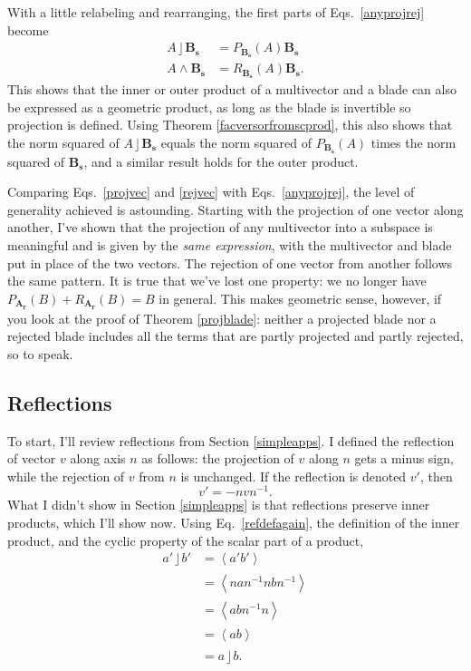 \documentclass{utarticle}
\newcommand{\bl}[1]{\ensuremath{\bm{#1}}}
\DeclareMathOperator{\lin}{\rfloor}
\DeclareMathOperator{\out}{\wedge}
\newcommand{\grade}[2][]{\ensuremath{\left\langle #2 \right\rangle_{#1}}}
\begin{document}
With a little relabeling and rearranging, the first parts of Eqs.~\eqref{anyprojrej} become
\begin{align} 
A \lin \bl{B_s} & = P_{\bl{B_s}}(A) \bl{B_s}  \nonumber \\
A \out \bl{B_s} & = R_{\bl{B_s}}(A) \bl{B_s}.
\label{inofbladeisprodofproj}
\end{align}
This shows that the inner or outer product of a multivector and a blade can also be
expressed as a geometric product, as long as the blade is invertible so projection is defined. 
Using Theorem \ref{facversorfromscprod}, this also shows that the norm squared of 
$A \lin \bl{B_s}$ equals the norm squared of $P_{\bl{B_s}}(A)$ times the 
norm squared of \bl{B_s}, and a similar result holds for the outer product.

Comparing Eqs.~\eqref{projvec} and \eqref{rejvec} with Eqs.~\eqref{anyprojrej}, the 
level of generality achieved is astounding.  Starting with the projection 
of one vector along another, I've shown that the projection of any multivector into 
a subspace is meaningful and is given by the \emph{same expression}, with 
the multivector and blade put in place of the two vectors.  The rejection of one 
vector from another follows the same pattern.  It is true that we've lost one property: we no
longer have $P_{\bl{A_r}}(B) + R_{\bl{A_r}}(B) = B$ in general.  This makes geometric
sense, however, if you look at the proof of Theorem \ref{projblade}: neither a projected
blade nor a rejected blade includes all the terms that are partly projected and 
partly rejected, so to speak.

\subsection{Reflections}
\label{refl}

To start, I'll review reflections from Section \ref{simpleapps}.  I defined the reflection of 
vector $v$ along axis $n$ as follows: the projection of $v$ along $n$ gets a minus
sign, while the rejection of $v$ from $n$ is unchanged.  If the reflection is denoted $v'$,
then
\begin{equation} v' = - nvn^{-1}. \label{refdefagain} \end{equation}
What I didn't show in Section \ref{simpleapps} is that reflections preserve inner products,
which I'll show now.  Using Eq.~\eqref{refdefagain}, the definition of the inner product, and the 
cyclic property of the scalar part of a product,
\begin{align}
a' \lin b' & = \grade{a' b'} \nonumber \\
 & = \grade{n a n^{-1} n b n^{-1}} \nonumber \\
 & = \grade{abn^{-1}n} \nonumber \\ 
 & = \grade{ab} \nonumber \\
 & = a \lin b.
\label{refinnerprod}
\end{align}
\end{document}
